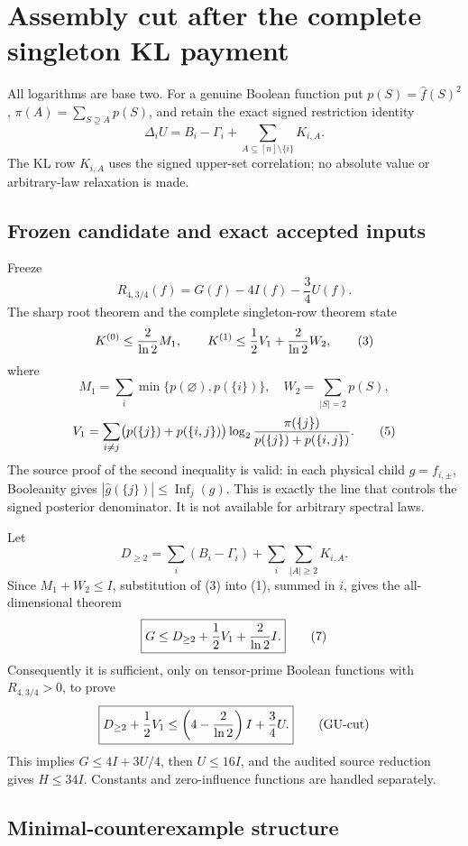 \section*{Assembly cut after the complete singleton KL payment}

All logarithms are base two.  For a genuine Boolean function put
\(p(S)=\widehat f(S)^2\), \(\pi(A)=\sum_{S\supseteq A}p(S)\), and retain
the exact signed restriction identity
\[
 \Delta_iU=B_i-\Gamma_i+\sum_{A\subseteq[n]\setminus\{i\}}K_{i,A}.
 \tag{1}
\]
The KL row \(K_{i,A}\) uses the signed upper-set correlation; no absolute
value or arbitrary-law relaxation is made.

\subsection*{Frozen candidate and exact accepted inputs}

Freeze
\[
 R_{4,3/4}(f)=G(f)-4I(f)-\frac34U(f).
 \tag{2}
\]
The sharp root theorem and the complete singleton-row theorem state
\[
 K^{(0)}\le {2\over\ln2}M_1,
 \qquad
 K^{(1)}\le {1\over2}V_1+{2\over\ln2}W_2,
 \tag{3}
\]
where
\[
 M_1=\sum_i\min\{p(\varnothing),p(\{i\})\},\quad
 W_2=\sum_{|S|=2}p(S),
 \tag{4}
\]
\[
 V_1=\sum_{i\ne j}
 \bigl(p(\{j\})+p(\{i,j\})\bigr)
 \log_2{\pi(\{j\})\over p(\{j\})+p(\{i,j\})}.
 \tag{5}
\]
The source proof of the second inequality is valid: in each physical child
\(g=f_{i,\pm}\), Booleanity gives
\(|\widehat g(\{j\})|\le\operatorname{Inf}_j(g)\).  This is exactly the
line that controls the signed posterior denominator.  It is not available
for arbitrary spectral laws.

Let
\[
 D_{\ge2}=\sum_i(B_i-\Gamma_i)
       +\sum_i\sum_{|A|\ge2}K_{i,A}.
 \tag{6}
\]
Since \(M_1+W_2\le I\), substitution of (3) into (1), summed in \(i\),
gives the all-dimensional theorem
\[
 \boxed{G\le D_{\ge2}+{1\over2}V_1+{2\over\ln2}I.}
 \tag{7}
\]
Consequently it is sufficient, only on tensor-prime Boolean functions with
\(R_{4,3/4}>0\), to prove
\[
 \boxed{
 D_{\ge2}+{1\over2}V_1
 \le\left(4-{2\over\ln2}\right)I+{3\over4}U.}
 \tag{GU-cut}
\]
This implies \(G\le4I+3U/4\), then \(U\le16I\), and the audited source
reduction gives \(H\le34I\).  Constants and zero-influence functions are
handled separately.

\subsection*{Minimal-counterexample structure}

